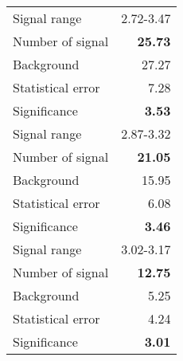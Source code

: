  {\large{
 \begin{tabular}{||l r||}
 \hline
 \hline
Signal range &      2.72-3.47 \\
Number of signal &  \textbf{  25.73} \\
Background &          27.27 \\
Statistical error &    7.28 \\
Significance &      \textbf{   3.53} \\
 \hline
Signal range &      2.87-3.32 \\
Number of signal &  \textbf{  21.05} \\
Background &          15.95 \\
Statistical error &    6.08 \\
Significance &      \textbf{   3.46} \\
 \hline
Signal range &      3.02-3.17 \\
Number of signal &  \textbf{  12.75} \\
Background &           5.25 \\
Statistical error &    4.24 \\
Significance &      \textbf{   3.01} \\
 \hline
 \hline
 \end{tabular}
 }}
 \endinput
